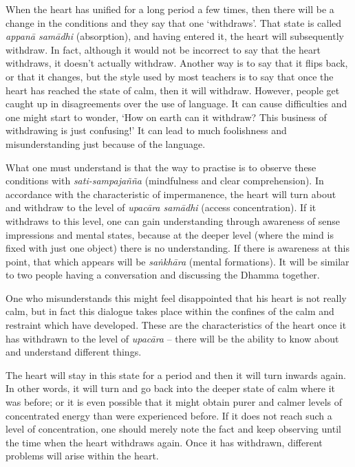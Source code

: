 When the heart has unified for a long period a few times, then there
will be a change in the conditions and they say that one `withdraws'. 
That state is called \emph{appanā samādhi} (absorption), and having
entered it, the heart will subsequently withdraw. In fact, although it
would not be incorrect to say that the heart withdraws, it doesn't
actually withdraw. Another way is to say that it flips back, or that it
changes, but the style used by most teachers is to say that once the
heart has reached the state of calm, then it will withdraw. However, 
people get caught up in disagreements over the use of language. It can
cause difficulties and one might start to wonder, `How on earth can it
withdraw? This business of withdrawing is just confusing!' It can lead
to much foolishness and misunderstanding just because of the language. 

What one must understand is that the way to practise is to observe these
conditions with \emph{sati-sampajañña} (mindfulness and clear
comprehension). In accordance with the characteristic of impermanence, 
the heart will turn about and withdraw to the level of \emph{upacāra
samādhi} (access concentration). If it withdraws to this level, one can
gain understanding through awareness of sense impressions and mental
states, because at the deeper level (where the mind is fixed with just
one object) there is no understanding. If there is awareness at this
point, that which appears will be \emph{saṅkhāra} (mental formations). 
It will be similar to two people having a conversation and discussing
the Dhamma together.

One who misunderstands this might feel disappointed
that his heart is not really calm, but in fact this dialogue takes place
within the confines of the calm and restraint which have developed. 
These are the characteristics of the heart once it has withdrawn to the
level of \emph{upacāra} -- there will be the ability to know about and
understand different things. 

The heart will stay in this state for a period and then it will turn
inwards again. In other words, it will turn and go back into the deeper
state of calm where it was before; or it is even possible that it might
obtain purer and calmer levels of concentrated energy than were
experienced before. If it does not reach such a level of concentration, 
one should merely note the fact and keep observing until the time when
the heart withdraws again. Once it has withdrawn, different problems
will arise within the heart. 


